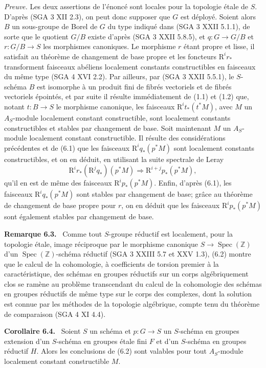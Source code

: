\documentclass[11pt]{article}
\newenvironment{statement}[1]{\par\medskip\noindent\textbf{#1.}\ }{\par\medskip}
\newcommand{\R}{\mathrm{R}}\newcommand{\RHomCore}{\mathrm{RHom}}
\providecommand{\R}{\mathrm R}
\begin{document}
\emph{Preuve.} Les deux assertions de l'énoncé sont locales pour la topologie étale de $S$. D'après (SGA 3 XII 2.3), on peut donc supposer que $G$ est déployé. Soient alors $B$ un sous-groupe de Borel de $G$ du type indiqué dans (SGA 3 XXII 5.1.1), de sorte que le quotient $G/B$ existe d'après (SGA 3 XXII 5.8.5), et $q:G\to G/B$ et $r:G/B\to S$ les morphismes canoniques. Le morphisme $r$ étant propre et lisse, il satisfait au théorème de changement de base propre et les foncteurs $\R^ir_*$ transforment faisceaux abéliens localement constants constructibles en faisceaux du même type (SGA 4 XVI 2.2). Par ailleurs, par (SGA 3 XXII 5.5.1), le $S$-schéma $B$ est isomorphe à un produit fini de fibrés vectoriels et de fibrés vectoriels épointés, et par suite il résulte immédiatement de (1.1) et (1.2) que, notant $t:B\to S$ le morphisme canonique, les faisceaux $\R^it_*(t^*M)$, avec $M$ un $A_S$-module localement constant constructible, sont localement constants constructibles et stables par changement de base. Soit maintenant $M$ un $A_S$-module localement constant constructible. Il résulte des considérations précédentes et de (6.1) que les faisceaux $\R^iq_*(p^*M)$ sont localement constants constructibles, et on en déduit, en utilisant la suite spectrale de Leray
\[
\R^ir_*(\R^jq_*)(p^*M)\Rightarrow \R^{i+j}p_*(p^*M),
\]
qu'il en est de même des faisceaux $\R^ip_*(p^*M)$. Enfin, d'après (6.1), les faisceaux $\R^iq_*(p^*M)$ sont stables par changement de base; grâce au théorème de changement de base propre pour $r$, on en déduit que les faisceaux $\R^ip_*(p^*M)$ sont également stables par changement de base.

\begin{statement}{Remarque 6.3}
Comme tout $S$-groupe réductif est localement, pour la topologie étale, image réciproque par le morphisme canonique $S\to\operatorname{Spec}(\mathbb Z)$ d'un $\operatorname{Spec}(\mathbb Z)$-schéma réductif (SGA 3 XXIII 5.7 et XXV 1.3), (6.2) montre que le calcul de la cohomologie, à coefficients de torsion premier à la caractéristique, des schémas en groupes réductifs sur un corps algébriquement clos se ramène au problème transcendant du calcul de la cohomologie des schémas en groupes réductifs de même type sur le corps des complexes, dont la solution est connue par les méthodes de la topologie algébrique, compte tenu du théorème de comparaison (SGA 4 XI 4.4).
\end{statement}

\begin{statement}{Corollaire 6.4}
Soient $S$ un schéma et $p:G\to S$ un $S$-schéma en groupes extension d'un $S$-schéma en groupes étale fini $F$ et d'un $S$-schéma en groupes réductif $H$. Alors les conclusions de (6.2) sont valables pour tout $A_S$-module localement constant constructible $M$.
\end{statement}
\end{document}
